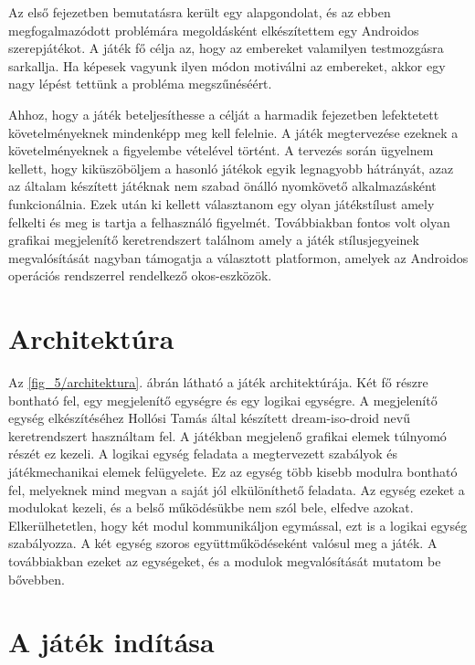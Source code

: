 Az első fejezetben bemutatásra került egy alapgondolat, és az ebben megfogalmazódott problémára megoldásként elkészítettem egy Androidos szerepjátékot. 
A játék fő célja az, hogy az embereket valamilyen testmozgásra sarkallja. 
Ha képesek vagyunk ilyen módon motiválni az embereket, akkor egy nagy lépést tettünk a probléma megszűnéséért. 

Ahhoz, hogy a játék beteljesíthesse a célját a harmadik fejezetben lefektetett követelményeknek mindenképp meg kell felelnie. 
A játék megtervezése ezeknek a követelményeknek a figyelembe vételével történt. 
A tervezés során ügyelnem kellett, hogy kiküszöböljem a hasonló játékok egyik legnagyobb hátrányát, azaz az általam készített játéknak nem szabad önálló nyomkövető alkalmazásként funkcionálnia. 
Ezek után ki kellett választanom egy olyan játékstílust amely felkelti és meg is tartja a felhasználó figyelmét. 
Továbbiakban fontos volt olyan grafikai megjelenítő keretrendszert találnom amely a játék stílusjegyeinek megvalósítását nagyban támogatja a választott platformon, amelyek az Androidos operációs rendszerrel rendelkező okos-eszközök.


\section{Architektúra}
\label{architektura}


Az \ref{fig_5/architektura}. ábrán látható a játék architektúrája. 
Két fő részre bontható fel, egy megjelenítő egységre és egy logikai egységre. 
A megjelenítő egység elkészítéséhez Hollósi Tamás által készített dream-iso-droid nevű keretrendszert használtam fel. 
A játékban megjelenő grafikai elemek túlnyomó részét ez kezeli. 
A logikai egység feladata a megtervezett szabályok és játékmechanikai elemek felügyelete. 
Ez az egység több kisebb modulra bontható fel, melyeknek mind megvan a saját jól elkülöníthető feladata. 
Az egység ezeket a modulokat kezeli, és a belső működésükbe nem szól bele, elfedve azokat. 
Elkerülhetetlen, hogy két modul kommunikáljon egymással, ezt is a logikai egység szabályozza. 
A két egység szoros együttműködéseként valósul meg a játék. 
A továbbiakban ezeket az egységeket, és a modulok megvalósítását mutatom be bővebben. 

\section{A játék indítása}
\label{jatekinditas}

